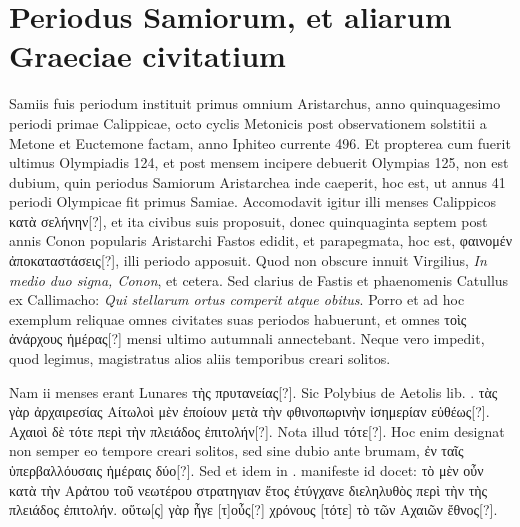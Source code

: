 \section{Periodus Samiorum, et aliarum Graeciae civitatium}

Samiis fuis periodum instituit primus omnium Aristarchus, anno
quinquagesimo periodi primae Calippicae, octo cyclis Metonicis
post observationem solstitii a Metone et Euctemone factam,
anno Iphiteo currente 496.
Et propterea cum fuerit ultimus Olympiadis
124, et post mensem incipere debuerit Olympias 125, non est
dubium, quin periodus Samiorum Aristarchea inde caeperit, hoc est,
ut annus 41 periodi Olympicae fit primus Samiae.
Accomodavit igitur
illi menses Calippicos \textgreek{κατὰ σελήνην[?]},
 et ita civibus suis proposuit, donec
quinquaginta septem post annis Conon popularis Aristarchi
Fastos edidit, et parapegmata, hoc est,
 \textgreek{φαινομέν ἀποκαταστάσεις[?]}, illi periodo
apposuit.
Quod non obscure innuit Virgilius, \emph{In medio duo signa,
Conon}, et cetera.
Sed clarius de Fastis et phaenomenis Catullus ex Callimacho:
\emph{Qui stellarum ortus comperit atque obitus}.
Porro et ad hoc
exemplum reliquae omnes civitates suas periodos habuerunt, et omnes
\textgreek{τοὶς ἀνάρχους ἡμέρας[?]} mensi ultimo autumnali annectebant.
Neque
vero impedit, quod legimus, magistratus alios aliis temporibus
creari solitos.

Nam ii menses erant Lunares \textgreek{τὴς πρυτανείας[?]}.
Sic Polybius
de Aetolis lib. .
 \textgreek{τὰς γὰρ ἀρχαιρεσίας Αίτωλοὶ μὲν ἐποίουν μετὰ
τὴν φθινοπωρινὴν ἰσημερίαν εὐθέως[?]}.
\textgreek{Αχαιοὶ δὲ τότε περὶ τὴν πλειάδος ἐπιτολήν[?]}.
Nota illud \textgreek{τότε[?]}.
Hoc enim designat non semper eo tempore
creari solitos, sed sine dubio ante brumam,
 \textgreek{ἐν ταῖς ὑπερβαλλόυσαις ἡμέραις
δύο[?]}.
Sed et idem in . manifeste id docet:
 \textgreek{τὸ μὲν οὖν κατὰ τὴν
Αρἀτου τοῦ νεωτέρου στρατηγιαν ἔτος ἐτύγχανε διεληλυθὸς
 περὶ τὴν τὴς πλειάδος ἐπιτολήν.
οὕτω[ς] γὰρ ἦγε [τ]οὖς[?] χρόνους [τότε] τὸ τῶν Αχαιῶν ἔθνος[?]}.

